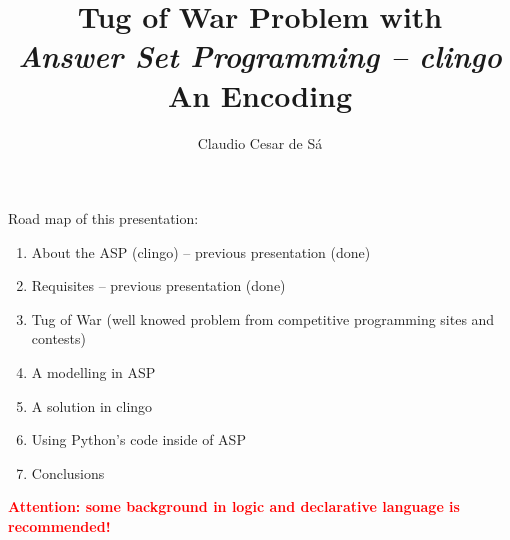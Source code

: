 \documentclass{beamer}
\title[Combinatorial  Optimization] %
{Tug of War Problem with \\ \textit{Answer Set Programming -- clingo}\\ An Encoding}
\author[Claudio Cesar de Sá] %
{Claudio Cesar de Sá}%
\institute[WhatsTV]{Independent Researcher}
\date[\today] %
\begin{document}
\begin{frame}
  \titlepage
  
\end{frame}








\begin{frame}

\begin{block}{Road map of this presentation:}

\begin{enumerate}

  \item  About the  ASP (clingo) -- previous presentation (done)
  \item  Requisites -- previous presentation (done)
  \item  Tug of War (well knowed problem from competitive programming sites and contests)
  \item  A modelling in ASP
  \item  A solution in clingo
  \item  Using Python's code inside of ASP
  \item  Conclusions

  \end{enumerate}

\end{block}

\pause
\textbf{\textcolor{red}{Attention: some background in logic and declarative language is recommended!}}


\end{frame}
\end{document}
